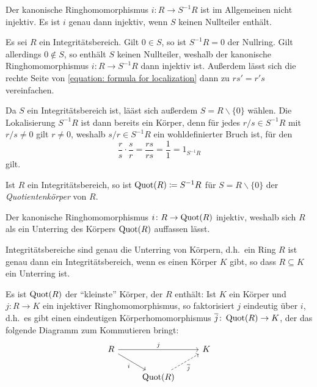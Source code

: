 \begin{warning}
  Der kanonische Ringhomomorphismus $i \colon R \to S^{-1} R$ ist im Allgemeinen nicht injektiv.
  Es ist $i$ genau dann injektiv, wenn $S$ keinen Nullteiler enthält.
\end{warning}

Es sei $R$ ein Integritätsbereich.
Gilt $0 \in S$, so ist $S^{-1} R = 0$ der Nullring.
Gilt allerdings $0 \notin S$, so enthält $S$ keinen Nullteiler, weshalb der kanonische Ringhomomorphismus $i \colon R \to S^{-1} R$ dann injektiv ist.
Außerdem lässt sich die rechte Seite von \eqref{equation: formula for localization} dann zu $rs' = r's$ vereinfachen.

Da $S$ ein Integritätsbereich ist, lääst sich außerdem $S = R \smallsetminus \{0\}$ wählen.
Die Lokalisierung $S^{-1} R$ ist dann bereits ein Körper, denn für jedes $r/s \in S^{-1} R$ mit $r/s \neq 0$ gilt $r \neq 0$, weshalb $s/r \in S^{-1} R$ ein wohldefinierter Bruch ist, für den
\[
        \frac{r}{s}
  \cdot \frac{s}{r}
  =     \frac{rs}{rs}
  =     \frac{1}{1}
  =     1_{S^{-1} R}
\]
gilt.

\begin{definition}
  Ist $R$ ein Integritätsbereich, so ist $\operatorname{Quot}(R) \coloneqq S^{-1} R$ für $S = R \smallsetminus \{0\}$ der \emph{Quotientenkörper} von $R$.
\end{definition}

Der kanonische Ringhomomorphismus $i \colon R \to \operatorname{Quot}(R)$ injektiv, weshalb sich $R$ als ein Unterring des Körpers $\operatorname{Quot}(R)$ auffassen lässt.

\begin{corollary}
  Integritätsbereiche sind genau die Unterring von Körpern, d.h.\ ein Ring $R$ ist genau dann ein Integritätsbereich, wenn es einen Körper $K$ gibt, so dass $R \subseteq K$ ein Unterring ist.
\end{corollary}

Es ist $\operatorname{Quot}(R)$ der \enquote{kleinste} Körper, der $R$ enthält:
Ist $K$ ein Körper und $j \colon R \to K$ ein injektiver Ringhomomorphismus, so faktorisiert $j$ eindeutig über $i$, d.h.\ es gibt einen eindeutigen Körperhomomorphismus $\overline{j} \colon \operatorname{Quot}(R) \to K$, der das folgende Diagramm zum Kommutieren bringt:
\[
  \begin{tikzcd}
      R
      \arrow{rr}[above]{j}
      \arrow{dr}[below left]{i}
    & {}
    & K
    \\
      {}
    & \Quot{R}
      \arrow[dashed]{ur}[below right]{\induced{j}}
    & {}
  \end{tikzcd}
\]

